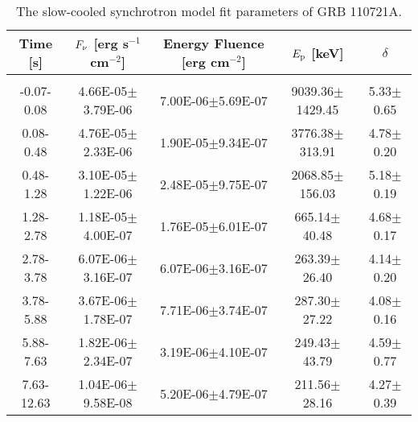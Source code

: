 \begin{table}[h]
\centering
\scriptsize
\label{tab:}
\begin{tabular}{c| c c c c}
Time [s] & $F_{\nu}$ [erg s$^{-1}$ cm$^{-2}$] & Energy Fluence [erg cm$^{-2}$] & $E_{\rm p}$ [keV] & $\delta$ \\
\hline \hline\\ 

-0.07-0.08 & 4.66E-05$\pm$3.79E-06 & 7.00E-06$\pm$5.69E-07 & 9039.36$\pm$1429.45 & 5.33$\pm$0.65 \\ 

0.08-0.48 & 4.76E-05$\pm$2.33E-06 & 1.90E-05$\pm$9.34E-07 & 3776.38$\pm$313.91 & 4.78$\pm$0.20 \\ 

0.48-1.28 & 3.10E-05$\pm$1.22E-06 & 2.48E-05$\pm$9.75E-07 & 2068.85$\pm$156.03 & 5.18$\pm$0.19 \\ 

1.28-2.78 & 1.18E-05$\pm$4.00E-07 & 1.76E-05$\pm$6.01E-07 & 665.14$\pm$40.48 & 4.68$\pm$0.17 \\ 

2.78-3.78 & 6.07E-06$\pm$3.16E-07 & 6.07E-06$\pm$3.16E-07 & 263.39$\pm$26.40 & 4.14$\pm$0.20 \\ 

3.78-5.88 & 3.67E-06$\pm$1.78E-07 & 7.71E-06$\pm$3.74E-07 & 287.30$\pm$27.22 & 4.08$\pm$0.16 \\ 

5.88-7.63 & 1.82E-06$\pm$2.34E-07 & 3.19E-06$\pm$4.10E-07 & 249.43$\pm$43.79 & 4.59$\pm$0.77 \\ 

7.63-12.63 & 1.04E-06$\pm$9.58E-08 & 5.20E-06$\pm$4.79E-07 & 211.56$\pm$28.16 & 4.27$\pm$0.39 \\ 

\end{tabular}
\caption{The slow-cooled synchrotron model fit parameters of GRB 110721A.}
\end{table}

